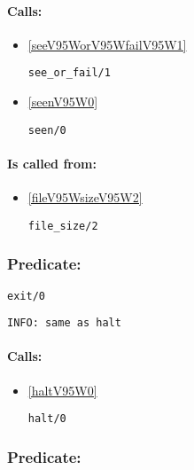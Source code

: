 \paragraph{Calls:} 
\begin{itemize}
\item \ref{seeV95WorV95WfailV95W1} 
\begin{verbatim}
see_or_fail/1
\end{verbatim}

\item \ref{seenV95W0} 
\begin{verbatim}
seen/0
\end{verbatim}

\end{itemize}
\paragraph{Is called from:} 
\begin{itemize}
\item \ref{fileV95WsizeV95W2} 
\begin{verbatim}
file_size/2
\end{verbatim}

\end{itemize}

\subsubsection{Predicate:} \label{exitV95W0}

\begin{verbatim}
exit/0
\end{verbatim}

{\small \begin{verbatim}
INFO: same as halt

\end{verbatim}}
\paragraph{Calls:} 
\begin{itemize}
\item \ref{haltV95W0} 
\begin{verbatim}
halt/0
\end{verbatim}

\end{itemize}

\subsubsection{Predicate:} \label{expV95W2}

